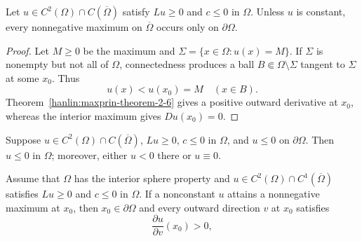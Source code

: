 \begin{theorem}\label{hanlin:maxprin-theorem-2-8}
Let $u\in C^2(\Omega)\cap C(\overline\Omega)$ satisfy $Lu\ge0$ and $c\le0$ in
$\Omega$. Unless $u$ is constant, every nonnegative maximum on
$\overline\Omega$ occurs only on $\partial\Omega$.
\end{theorem}
\begin{proof}
\sketch Let $M\ge0$ be the maximum and
$\Sigma=\{x\in\Omega:u(x)=M\}$. If $\Sigma$ is nonempty but not all of
$\Omega$, connectedness produces a ball $B\Subset\Omega\setminus\Sigma$ tangent
to $\Sigma$ at some $x_0$. Thus
\[
u(x)<u(x_0)=M\quad(x\in B).
\]
Theorem~\ref{hanlin:maxprin-theorem-2-6} gives a positive outward derivative at
$x_0$, whereas the interior maximum gives $Du(x_0)=0$.
\end{proof}

\begin{corollary}\label{hanlin:maxprin-cor-2-9}
Suppose $u\in C^2(\Omega)\cap C(\overline\Omega)$, $Lu\ge0$, $c\le0$ in
$\Omega$, and $u\le0$ on $\partial\Omega$. Then $u\le0$ in $\Omega$; moreover,
either $u<0$ there or $u\equiv0$.
\end{corollary}

\begin{corollary}\label{hanlin:maxprin-cor-2-10}
Assume that $\Omega$ has the interior sphere property and
$u\in C^2(\Omega)\cap C^1(\overline\Omega)$ satisfies $Lu\ge0$ and $c\le0$ in
$\Omega$. If a nonconstant $u$ attains a nonnegative maximum at $x_0$, then
$x_0\in\partial\Omega$ and every outward direction $v$ at $x_0$ satisfies
\[
\frac{\partial u}{\partial v}(x_0)>0,
\]
\end{corollary}

